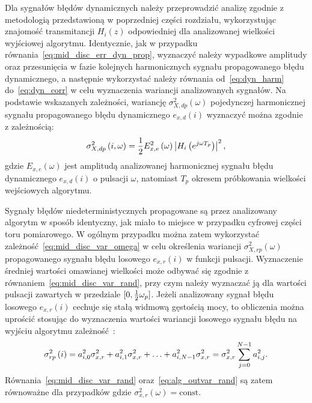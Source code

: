 Dla sygnałów błędów dynamicznych należy przeprowadzić analizę zgodnie z metodologią przedstawioną w poprzedniej części rozdziału, wykorzystując znajomość transmitancji $H_{i}(z)$ odpowiedniej dla analizowanej wielkości wyjściowej algorytmu. Identycznie, jak w przypadku równania~\eqref{eq:mid_disc_err_dyn_prop}, wyznaczyć należy wypadkowe amplitudy oraz przesunięcia w fazie kolejnych harmonicznych sygnału propagowanego błędu dynamicznego, a następnie wykorzystać należy równania od~\eqref{eq:dyn_harm} do~\eqref{eq:dyn_corr} w celu wyznaczenia wariancji analizowanych sygnałów. Na podstawie wskazanych zależności, wariancję $\sigma_{X,dp}^{2}(\omega)$ pojedynczej harmonicznej sygnału propagowanego błędu dynamicznego $e_{x,d}(i)$ wyznaczyć można zgodnie z zależnością:
\begin{equation}
\sigma_{X,dp}^{2} \left(i, \omega\right) = \frac{1}{2} E_{x,e}^{2} \left(\omega\right) \left| H_{i} \left(e^{j\omega T_{p}}\right) \right|^{2} \label{eq:alg_outvar_dyn},
\end{equation}
gdzie $E_{x,e}(\omega)$ jest amplitudą analizowanej harmonicznej sygnału błędu dynamicznego $e_{x,d}(i)$ o pulsacji $\omega$, natomiast $T_{p}$ okresem próbkowania wielkości wejściowych algorytmu.

Sygnały błędów niedeterministycznych propagowane są przez analizowany algorytm w sposób identyczny, jak miało to miejsce w przypadku cyfrowej części toru pomiarowego. W ogólnym przypadku można zatem wykorzystać zależność~\eqref{eq:mid_disc_var_omega} w celu określenia wariancji $\sigma_{X,rp}^{2}(\omega)$ propagowanego sygnału błędu losowego $e_{x,r}(i)$ w funkcji pulsacji. Wyznaczenie średniej wartości omawianej wielkości może odbywać się zgodnie z równaniem~\eqref{eq:mid_disc_var_rand}, przy czym należy wyznaczać ją dla wartości pulsacji zawartych w przedziale $\interval{0}{\frac{1}{2} \omega_{p}}$. Jeżeli analizowany sygnał błędu losowego $e_{x,r}(i)$ cechuje się stałą widmową gęstością mocy, to obliczenia można uprościć stosując do wyznaczenia wartości wariancji losowego sygnału błędu na wyjściu algorytmu zależność~\cite{jakubiec_system}:
\begin{equation}
\sigma_{rp}^{2} \left(i\right) = a_{i, 0}^{2} \sigma_{x,r}^{2} + a_{i, 1}^{2} \sigma_{x,r}^{2} + \hdots + a_{i, N-1}^{2} \sigma_{x,r}^{2} = \sigma_{x,r}^{2} \sum _{j=0} ^{N-1} {a_{i, j}^{2}} \label{eq:alg_outvar_rand}.
\end{equation}
Równania~\eqref{eq:mid_disc_var_rand} oraz~\eqref{eq:alg_outvar_rand} są zatem równoważne dla przypadków gdzie $\sigma_{x,r}^{2}(\omega) = \text{const}$.

